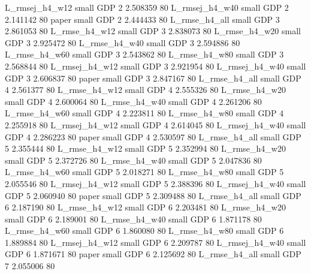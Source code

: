 L_rmsej_h4_w12      small      GDP                 2 2.508359 80
L_rmsej_h4_w40      small      GDP                 2 2.141142 80
         paper      small      GDP                 2 2.444433 80
 L_rmse_h4_all      small      GDP                 3 2.861053 80
 L_rmse_h4_w12      small      GDP                 3 2.838073 80
 L_rmse_h4_w20      small      GDP                 3 2.925472 80
 L_rmse_h4_w40      small      GDP                 3 2.594886 80
 L_rmse_h4_w60      small      GDP                 3 2.543862 80
 L_rmse_h4_w80      small      GDP                 3 2.568844 80
L_rmsej_h4_w12      small      GDP                 3 2.921954 80
L_rmsej_h4_w40      small      GDP                 3 2.606837 80
         paper      small      GDP                 3 2.847167 80
 L_rmse_h4_all      small      GDP                 4 2.561377 80
 L_rmse_h4_w12      small      GDP                 4 2.555326 80
 L_rmse_h4_w20      small      GDP                 4 2.600064 80
 L_rmse_h4_w40      small      GDP                 4 2.261206 80
 L_rmse_h4_w60      small      GDP                 4 2.223811 80
 L_rmse_h4_w80      small      GDP                 4 2.255918 80
L_rmsej_h4_w12      small      GDP                 4 2.614045 80
L_rmsej_h4_w40      small      GDP                 4 2.286223 80
         paper      small      GDP                 4 2.530597 80
 L_rmse_h4_all      small      GDP                 5 2.355444 80
 L_rmse_h4_w12      small      GDP                 5 2.352994 80
 L_rmse_h4_w20      small      GDP                 5 2.372726 80
 L_rmse_h4_w40      small      GDP                 5 2.047836 80
 L_rmse_h4_w60      small      GDP                 5 2.018271 80
 L_rmse_h4_w80      small      GDP                 5 2.055546 80
L_rmsej_h4_w12      small      GDP                 5 2.388396 80
L_rmsej_h4_w40      small      GDP                 5 2.060940 80
         paper      small      GDP                 5 2.309488 80
 L_rmse_h4_all      small      GDP                 6 2.187190 80
 L_rmse_h4_w12      small      GDP                 6 2.203481 80
 L_rmse_h4_w20      small      GDP                 6 2.189001 80
 L_rmse_h4_w40      small      GDP                 6 1.871178 80
 L_rmse_h4_w60      small      GDP                 6 1.860080 80
 L_rmse_h4_w80      small      GDP                 6 1.889884 80
L_rmsej_h4_w12      small      GDP                 6 2.209787 80
L_rmsej_h4_w40      small      GDP                 6 1.871671 80
         paper      small      GDP                 6 2.125692 80
 L_rmse_h4_all      small      GDP                 7 2.055006 80
